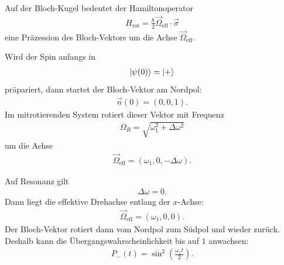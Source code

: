 \documentclass[11pt,a4paper]{scrartcl}
\begin{document}
\begin{enumerate}[label=(\alph*)]
\begin{calculationbox}
            \begin{calculationbox}[title=Bewegung des Bloch-Vektors]
                Auf der Bloch-Kugel bedeutet der Hamiltonoperator
                \begin{align*}
                    H_{\mathrm{rot}}
                    =
                    \frac{\hbar}{2}\vec\Omega_{\mathrm{eff}}\cdot\vec\sigma
                \end{align*}
                eine Präzession des Bloch-Vektors um die Achse $\vec\Omega_{\mathrm{eff}}$.

                Wird der Spin anfangs in
                \begin{align*}
                    \ket{\psi(0)}=\ket{+}
                \end{align*}
                präpariert, dann startet der Bloch-Vektor am Nordpol:
                \begin{align*}
                    \vec n(0)=(0,0,1).
                \end{align*}
                Im mitrotierenden System rotiert dieser Vektor mit Frequenz
                \begin{align*}
                    \Omega_R=\sqrt{\omega_1^2+\Delta\omega^2}
                \end{align*}
                um die Achse
                \begin{align*}
                    \vec\Omega_{\mathrm{eff}}
                    =
                    (\omega_1,0,-\Delta\omega).
                \end{align*}
            \end{calculationbox}

            \begin{calculationbox}[title=Resonanz und Nichtresonanz]
                Auf Resonanz gilt
                \begin{align*}
                    \Delta\omega=0.
                \end{align*}
                Dann liegt die effektive Drehachse entlang der $x$-Achse:
                \begin{align*}
                    \vec\Omega_{\mathrm{eff}}=(\omega_1,0,0).
                \end{align*}
                Der Bloch-Vektor rotiert dann vom Nordpol zum Südpol und wieder zurück. Deshalb kann die Übergangswahrscheinlichkeit bis auf $1$ anwachsen:
                \begin{align*}
                    P_-(t)=\sin^2\left(\frac{\omega_1t}{2}\right).
                \end{align*}


\end{calculationbox}
\end{calculationbox}
\end{enumerate}
\end{document}

